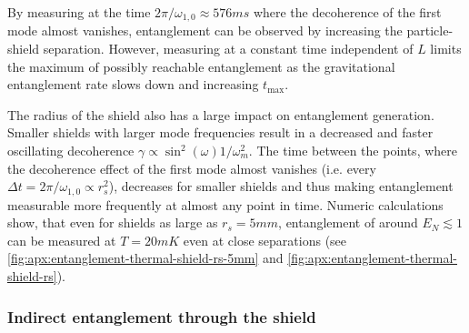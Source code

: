 By measuring at the time $2\pi/\omega_{1,0} \approx 576\si{ms}$ where the decoherence of the first mode almost vanishes, entanglement can be observed by increasing the particle-shield separation.
However, measuring at a constant time independent of $L$ limits the maximum of possibly reachable entanglement as the gravitational entanglement rate slows down and increasing $t_\mathrm{max}$.

The radius of the shield also has a large impact on entanglement generation. Smaller shields with larger mode frequencies result in a decreased and faster oscillating decoherence $\gamma \propto \sin^2(\omega) 1/\omega_m^2$.
The time between the points, where the decoherence effect of the first mode almost vanishes (i.e. every $\Delta t = 2\pi/\omega_{1,0} \propto r_s^2$), decreases for smaller shields and thus making entanglement measurable more frequently at almost any point in time.
Numeric calculations show, that even for shields as large as $r_s = 5\si{mm}$, entanglement of around $E_N \lesssim 1$ can be measured at $T = 20\si{mK}$ even at close separations (see \cref{fig:apx:entanglement-thermal-shield-rs-5mm} and \cref{fig:apx:entanglement-thermal-shield-rs}).

\subsubsection*{Indirect entanglement through the shield}

